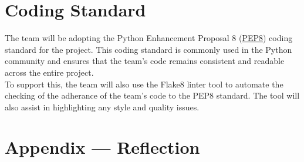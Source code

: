 \documentclass{article}
\begin{document}
\FloatBarrier 

\section{Coding Standard}
The team will be adopting the Python Enhancement Proposal 8 (\href{https://peps.python.org/pep-0008/}{PEP8}) 
coding standard for the project. This coding standard is commonly used in the 
Python community and ensures that the team's code remains 
consistent and readable across the entire project.\\
To support this, the team will also use the Flake8 linter tool to automate the 
checking of the adherance of the team's code to the PEP8 standard. The tool will
also assist in highlighting any style and quality issues.

\newpage{}

\section*{Appendix --- Reflection}



\end{document}
